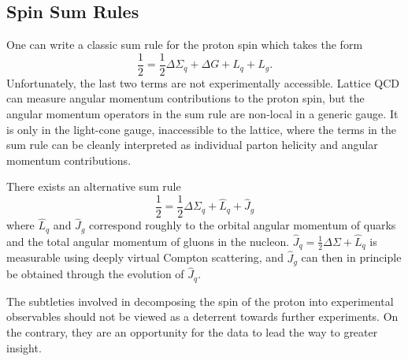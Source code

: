 \subsection{Spin Sum Rules}

One can write a classic sum rule for the proton spin which takes the form
\cite{Hagler:1998kg, Harindranath:1998ve, Bashinsky:1998if}
%
\begin{equation}
  \frac{1}{2} = \frac{1}{2}\Delta \Sigma_q + \Delta G + L_q + L_g.
  \label{eqn:jaffe-sum-rule}
\end{equation}
%
Unfortunately, the last two terms are not experimentally accessible. Lattice QCD
can measure angular momentum contributions to the proton spin, but the angular
momentum operators in the sum rule are non-local in a generic gauge. It is only
in the light-cone gauge, inaccessible to the lattice, where the terms in the sum
rule can be cleanly interpreted as individual parton helicity and angular
momentum contributions.

There exists an alternative sum rule \cite{Jaffe1990509, Ji:1996ek}
%
\begin{equation}
  \frac{1}{2} = \frac{1}{2}\Delta \Sigma_q + \hat{L}_q + \hat{J}_g
\end{equation}
%
where \(\hat{L}_q\) and \(\hat{J}_g\) correspond roughly to the orbital angular momentum of quarks and the total angular momentum of gluons in the nucleon. \(\hat{J}_q = \frac{1}{2}\Delta \Sigma + \hat{L}_q\) is measurable using deeply virtual Compton scattering, and \(\hat{J}_g\) can then in principle be obtained through the evolution of \(\hat{J}_q\).

The subtleties involved in decomposing the spin of the proton into experimental observables should not be viewed as a deterrent towards further experiments.  On the contrary, they are an opportunity for the data to lead the way to greater insight.
